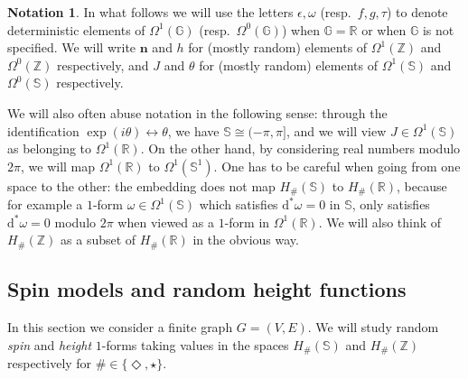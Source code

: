 \documentclass[11pt, reqno]{amsart}
\numberwithin{equation}{section}
\theoremstyle{definition}
\newtheorem*{notation}{Notation}
\theoremstyle{remark}
\newcommand{\RR}{\mathbb{R}}
\renewcommand{\d}{\mathrm{d}}
\newcommand{\Group}{{\ensuremath{\mathbb{G}}}}
\newcommand{\J}{J}
\newcommand{\n}{\mathbf{n}}
\newcommand{\exact}{\star}
\newcommand{\coclosed}{\Diamond}
\begin{document}
\begin{notation}
In what follows we will use the letters $\epsilon, \omega$ (resp.\ $f,g,\tau$) to denote deterministic elements of $\Omega^1(\Group)$ (resp.\ $\Omega^0(\Group)$) when $\Group=\mathbb R$ or when $\mathbb G$ is not specified. 
We will write $\n$ and $h$ for (mostly random) elements of $\Omega^1(\mathbb Z)$ and $ \Omega^0(\mathbb Z)$ respectively, and $J$ and $\theta$ for (mostly random)
elements of $\Omega^1(\mathbb S)$ and $ \Omega^0(\mathbb S)$ respectively.

We will also often abuse notation in the following sense: through the identification $\exp( i\theta)\leftrightarrow\theta$, we have $\mathbb{S} \cong (-\pi, \pi]$, and
we will view $\J \in \Omega^1(\mathbb{S})$ as belonging to $\Omega^{1}(\RR)$. On the other hand, by considering real numbers modulo $2\pi$, 
we will map $\Omega^1(\RR)$ to $\Omega^1(\mathbb{S}^1)$.
One has to be careful when going from one space to the other: the embedding does not map $H_{\#} (\mathbb{S})$ to $H_{\#}(\RR)$, 
because for example a $1$-form $\omega \in \Omega^1(\mathbb{S})$ which satisfies $\d^* \omega= 0$ in $\mathbb{S}$, 
only satisfies $\d^*\omega = 0$ modulo $2\pi$ when viewed as a $1$-form in $\Omega^1(\mathbb{R})$. We will also think of $H_{\#}(\mathbb Z)$
as a subset of  $H_{\#}(\mathbb R)$ in the obvious way.
\end{notation}



\subsection{Spin models and random height functions}
In this section we consider a finite graph $G = (V,E)$. 
We will study random \emph{spin} and \emph{height} $1$-forms 
taking values in the spaces $H_{\#}(\mathbb S)$ and $H_{\#}(\mathbb Z)$ respectively for $\# \in \{\coclosed, \exact\}$. 
\end{document}
